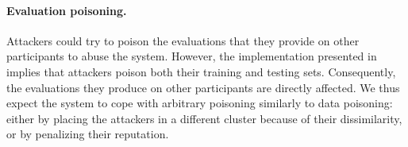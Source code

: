 
\paragraph{Evaluation poisoning.}
Attackers could try to poison the evaluations that they provide on other participants to abuse the system.
However, the implementation presented in  implies that attackers poison both their training and testing sets.
Consequently, the evaluations they produce on other participants are directly affected.
We thus expect the system to cope with arbitrary poisoning similarly to data poisoning: either by placing the attackers in a different cluster because of their dissimilarity, or by penalizing their reputation. 

